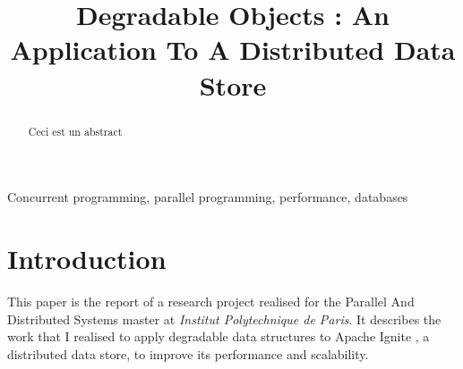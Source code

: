 \documentclass[conference]{IEEEtran}
\begin{document}
\title{Degradable Objects : An Application To A Distributed Data Store}

\author{
}

\maketitle
\thispagestyle{plain}
\pagestyle{plain}

\begin{abstract}
Ceci est un abstract
\end{abstract}

\begin{IEEEkeywords}
Concurrent programming, parallel programming, performance, databases
\end{IEEEkeywords}

\section{Introduction}
This paper is the report of a research project realised for the Parallel And Distributed Systems master at \textit{Institut Polytechnique de Paris}. It describes the work that I realised to apply degradable data structures to Apache Ignite \cite{ignite}, a distributed data store, to improve its performance and scalability.
\end{document}
